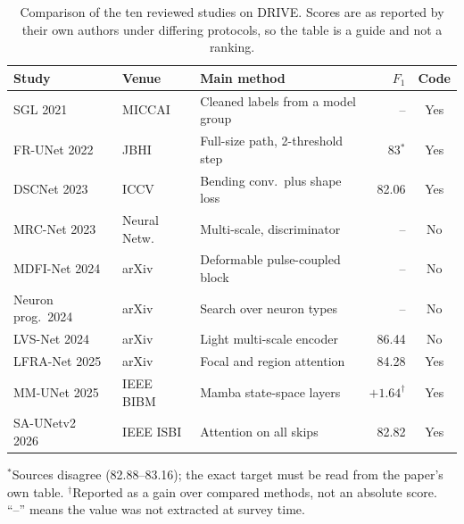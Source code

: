 \documentclass[conference]{IEEEtran}
\begin{document}
\begin{table}[!t]
  \caption{Comparison of the ten reviewed studies on DRIVE. Scores are as
  reported by their own authors under differing protocols, so the table is a
  guide and not a ranking.}
  \label{tab:comparison}
  \centering
  \renewcommand{\arraystretch}{1.18}
  \setlength{\tabcolsep}{4pt}
  \begin{tabular}{@{} l l p{2.5cm} r c @{}}
    \toprule
    \textbf{Study} & \textbf{Venue} & \textbf{Main method} &
    \textbf{$F_1$} & \textbf{Code} \\
    \midrule
    SGL 2021~\cite{sgl}          & MICCAI       & Cleaned labels from a model group & --    & Yes \\
    FR-UNet 2022~\cite{frunet}   & JBHI         & Full-size path, 2-threshold step   & 83$^{*}$ & Yes \\
    DSCNet 2023~\cite{dscnet}    & ICCV         & Bending conv.\ plus shape loss     & 82.06 & Yes \\
    MRC-Net 2023~\cite{mrcnet}   & Neural Netw. & Multi-scale, discriminator         & --    & No  \\
    MDFI-Net 2024~\cite{mdfinet} & arXiv        & Deformable pulse-coupled block     & --    & No  \\
    Neuron prog.\ 2024~\cite{neuronprog} & arXiv & Search over neuron types          & --    & No  \\
    LVS-Net 2024~\cite{lvsnet}   & arXiv        & Light multi-scale encoder          & 86.44 & No  \\
    LFRA-Net 2025~\cite{lfranet} & arXiv        & Focal and region attention         & 84.28 & Yes \\
    MM-UNet 2025~\cite{mmunet}   & IEEE BIBM    & Mamba state-space layers           & $+1.64^{\dagger}$ & Yes \\
    SA-UNetv2 2026~\cite{saunetv2} & IEEE ISBI  & Attention on all skips             & 82.82 & Yes \\
    \bottomrule
  \end{tabular}

  \vspace{3pt}
  {\footnotesize $^{*}$Sources disagree (82.88--83.16); the exact target must be
  read from the paper's own table. $^{\dagger}$Reported as a gain over compared
  methods, not an absolute score. ``--'' means the value was not extracted at
  survey time.}
\end{table}

\end{document}
